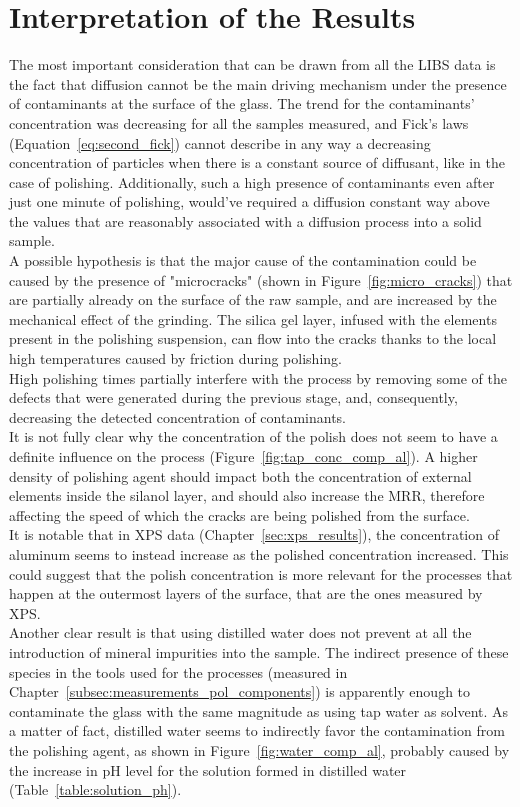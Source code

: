 \section{Interpretation of the Results}
\label{sec:considerations}
The most important consideration that can be drawn from all the LIBS data is the fact that diffusion cannot be the main driving mechanism under the presence of contaminants at the surface of the glass. The trend for the contaminants' concentration was decreasing for all the samples measured, and Fick's laws (Equation~\ref{eq:second_fick}) cannot describe in any way a decreasing concentration of particles when there is a constant source of diffusant, like in the case of polishing. Additionally, such a high presence of contaminants even after just one minute of polishing, would've required a diffusion constant way above the values that are reasonably associated with a diffusion process into a solid sample.
\\
A possible hypothesis is that the major cause of the contamination could be caused by the presence of "microcracks" (shown in Figure~\ref{fig:micro_cracks}) that are partially already on the surface of the raw sample, and are increased by the mechanical effect of the grinding. The silica gel layer, infused with the elements present in the polishing suspension, can flow into the cracks thanks to the local high temperatures caused by friction during polishing.
\\
High polishing times partially interfere with the process by removing some of the defects that were generated during the previous stage, and, consequently, decreasing the detected concentration of contaminants.
\\
It is not fully clear why the concentration of the polish does not seem to have a definite influence on the process (Figure~\ref{fig:tap_conc_comp_al}). A higher density of polishing agent should impact both the concentration of external elements inside the silanol layer, and should also increase the MRR, therefore affecting the speed of which the cracks are being polished from the surface.
\\
It is notable that in XPS data (Chapter~\ref{sec:xps_results}), the concentration of aluminum seems to instead increase as the polished concentration increased. This could suggest that the polish concentration is more relevant for the processes that happen at the outermost layers of the surface, that are the ones measured by XPS.
\\
Another clear result is that using distilled water does not prevent at all the introduction of mineral impurities into the sample. The indirect presence of these species in the tools used for the processes (measured in Chapter~\ref{subsec:measurements_pol_components}) is apparently enough to contaminate the glass with the same magnitude as using tap water as solvent. As a matter of fact, distilled water seems to indirectly favor the contamination from the polishing agent, as shown in Figure~\ref{fig:water_comp_al}, probably caused by the increase in pH level for the solution formed in distilled water (Table~\ref{table:solution_ph}).


